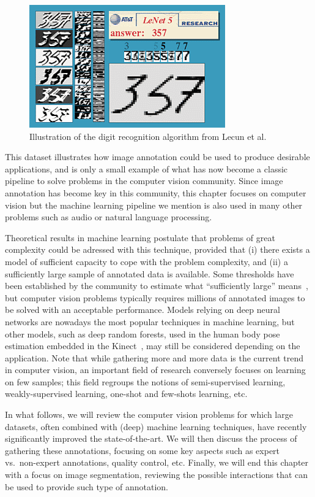 \begin{figure}[ht]
\centering
\includegraphics[width=0.5\columnwidth]{assets/img/lenet-results.png}
\caption{Illustration of the digit recognition algorithm from Lecun et al.\ \cite{lecun1998gradient}}%
\label{fig:lenet}
\end{figure}

This dataset illustrates how image annotation could be used
to produce desirable applications, and is only a small example of what
has now become a classic pipeline to solve problems in the computer vision community.
Since image annotation has become key in this community,
this chapter focuses on computer vision but
the machine learning pipeline we mention is also used in many other problems
such as audio or natural language processing.

Theoretical results in machine learning postulate that
problems of great complexity could be adressed with this technique,
provided that (i) there exists a model of sufficient capacity
to cope with the problem complexity,
and (ii) a sufficiently large sample of annotated data is available.
Some thresholds have been established by the community to estimate
what ``sufficiently large'' means~\cite{raudys1991small, jain198239},
but computer vision problems typically requires millions
of annotated images to be solved with an acceptable performance.
Models relying on deep neural networks are nowadays
the most popular techniques in machine learning,
but other models, such as deep random forests,
used in the human body pose estimation embedded in the Kinect~\cite{shotton2011real},
may still be considered depending on the application.
Note that while gathering more and more data is the current trend in computer vision,
an important field of research conversely focuses on learning on few samples;
this field regroups the notions of semi-supervised learning,
weakly-supervised learning, one-shot and few-shots learning, etc.

In what follows, we will review the computer vision problems for which large datasets,
often combined with (deep) machine learning techniques,
have recently significantly improved the state-of-the-art.
We will then discuss the process of gathering these annotations,
focusing on some key aspects such as expert vs.\ non-expert annotations, quality control, etc.
Finally, we will end this chapter with a focus on image segmentation, reviewing the possible interactions that can be used to provide such type of annotation.

